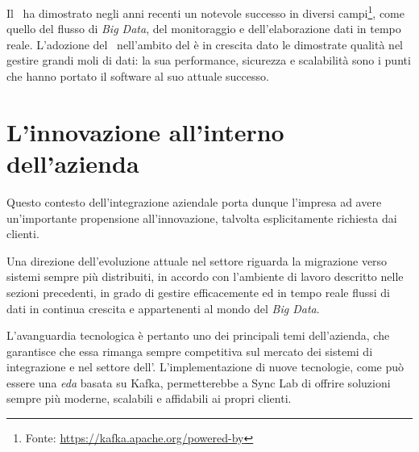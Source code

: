 Il \software\ ha dimostrato negli anni recenti un notevole successo in diversi campi\footnote{Fonte: \url{https://kafka.apache.org/powered-by}}, come quello del flusso di \textit{Big Data}, del monitoraggio e dell'elaborazione dati in tempo reale.
L'adozione del \software\ nell'ambito del  è in crescita dato le dimostrate qualità nel gestire grandi moli di dati: la sua performance, sicurezza e scalabilità sono i punti che hanno portato il software al suo attuale successo.

\section{L'innovazione all'interno dell'azienda}


Questo contesto dell'integrazione aziendale porta dunque l'impresa ad avere un'importante propensione all'innovazione, talvolta esplicitamente richiesta dai clienti.

Una direzione dell'evoluzione attuale nel settore  riguarda la migrazione verso sistemi sempre più distribuiti, in accordo con l'ambiente di lavoro descritto nelle sezioni precedenti, in grado di gestire efficacemente ed in tempo reale flussi di dati in continua crescita e appartenenti al mondo del \textit{Big Data}.

L'avanguardia tecnologica è pertanto uno dei principali temi dell'azienda, che garantisce che essa rimanga sempre competitiva sul mercato dei sistemi di integrazione e nel settore dell'.
L'implementazione di nuove tecnologie, come può essere una \textit{\acrlong{eda}} basata su Kafka, permetterebbe a Sync Lab di offrire soluzioni sempre più moderne, scalabili e affidabili ai propri clienti.
